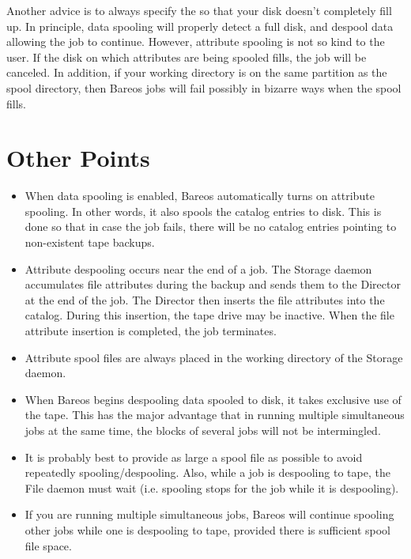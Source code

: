 
Another advice is to always specify the  so that your disk
doesn't completely fill up. In principle, data spooling will properly detect a
full disk, and despool data allowing the job to continue. However, attribute
spooling is not so kind to the user. If the disk on which attributes are being
spooled fills, the job will be canceled. In addition, if your working
directory is on the same partition as the spool directory, then Bareos jobs
will fail possibly in bizarre ways when the spool fills.

\section{Other Points}

\begin{itemize}
\item When data spooling is enabled, Bareos automatically  turns on attribute
   spooling. In other words, it also  spools the catalog entries to disk. This is
   done so  that in case the job fails, there will be no catalog  entries
   pointing to non-existent tape backups.
\item Attribute despooling occurs near the end of a job.  The Storage daemon
   accumulates file attributes during the backup and  sends them to the
   Director at the end of the job.  The Director then inserts the file
   attributes into the catalog.  During this insertion, the tape drive may
   be inactive.  When the file attribute insertion is completed, the job
   terminates.
\item Attribute spool files are always placed in the  working directory of
   the Storage daemon.
\item When Bareos begins despooling data spooled to disk, it  takes exclusive
   use of the tape. This has the major  advantage that in running multiple
   simultaneous jobs at  the same time, the blocks of several jobs will not be
   intermingled.
\item It is probably best to provide as large a spool file as  possible to
   avoid repeatedly spooling/despooling. Also,  while a job is despooling to
   tape, the File daemon must wait  (i.e. spooling stops for the job while it is
   despooling).
\item If you are running multiple simultaneous jobs, Bareos  will continue
   spooling other jobs while one is despooling  to tape, provided there is
   sufficient spool file space.
\end{itemize}
